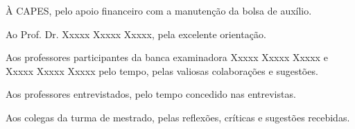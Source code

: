 À CAPES, pelo apoio financeiro com a manutenção da bolsa de auxílio.

Ao Prof. Dr. Xxxxx Xxxxx Xxxxx, pela excelente orientação.

Aos professores participantes da banca examinadora Xxxxx Xxxxx Xxxxx e Xxxxx Xxxxx Xxxxx pelo tempo, pelas valiosas colaborações e sugestões.

Aos professores entrevistados, pelo tempo concedido nas entrevistas.

Aos colegas da turma de mestrado, pelas reflexões, críticas e sugestões recebidas.
